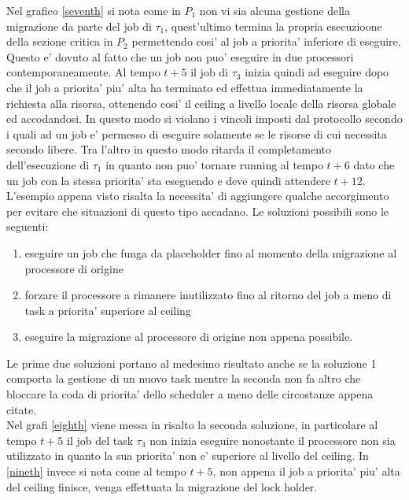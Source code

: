 \documentclass[a4paper,11pt]{article}
\begin{document}
\noindent Nel grafico \ref{seventh} si nota come in $P_1$ non vi sia alcuna gestione della migrazione da parte del job di $\tau_1$, quest'ultimo termina la propria esecuzioone della sezione critica in $P_2$ permettendo cosi' al job a priorita' inferiore di eseguire. Questo e' dovuto al fatto che un job non puo' eseguire in due processori contemporaneamente. Al tempo $t + 5$ il job di $\tau_3$ inizia quindi ad eseguire dopo che il job a priorita' piu' alta ha terminato ed effettua immediatamente la richiesta alla risorsa, ottenendo cosi' il ceiling a livello locale della risorsa globale ed accodandosi. In questo modo si violano i vincoli imposti dal protocollo secondo i quali ad un job e' permesso di eseguire solamente se le risorse di cui necessita secondo libere. Tra l'altro in questo modo ritarda il completamento dell'esecuzione di $\tau_1$ in quanto non puo' tornare running al tempo $t + 6$ dato che un job con la stessa priorita' sta eseguendo e deve quindi attendere $t + 12$.\\

\noindent L'esempio appena visto risalta la necessita' di aggiungere qualche accorgimento per evitare che situazioni di questo tipo accadano. Le soluzioni possibili sono le seguenti:

\begin{enumerate}
\item eseguire un job che funga da placeholder fino al momento della migrazione al processore di origine
\item forzare il processore a rimanere inutilizzato fino al ritorno del job a meno di task a priorita' superiore al ceiling
\item eseguire la migrazione al processore di origine non appena possibile.
\end{enumerate}

\noindent Le prime due soluzioni portano al medesimo risultato anche se la soluzione 1 comporta la gestione di un nuovo task mentre la seconda non fa altro che bloccare la coda di priorita' dello scheduler a meno delle circostanze appena citate.\\

\noindent Nel grafi \ref{eighth} viene messa in risalto la seconda soluzione, in particolare al tempo $t + 5$ il job del task $\tau_3$ non inizia eseguire nonostante il processore non sia utilizzato in quanto la sua priorita' non e' superiore al livello del ceiling. In \ref{nineth} invece si nota come al tempo $t + 5$, non appena il job a priorita' piu' alta del ceiling finisce, venga effettuata la migrazione del lock holder.\\
\end{document}
